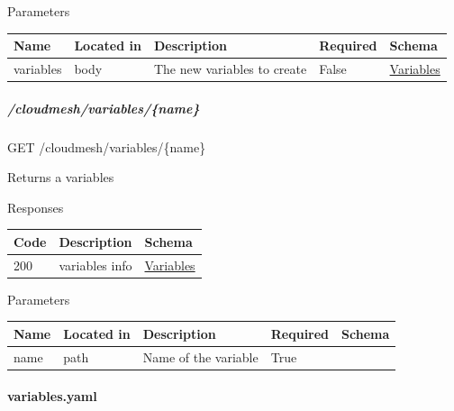 \documentclass[9pt,]{article}
\let\oldparagraph\paragraph
\renewcommand{\paragraph}[1]{\oldparagraph{#1}\mbox{}}
\let\oldsubparagraph\subparagraph
\renewcommand{\subparagraph}[1]{\oldsubparagraph{#1}\mbox{}}
\begin{document}
Parameters

\begin{longtable}[]{@{}lllll@{}}
\toprule
Name & Located in & Description & Required & Schema\tabularnewline
\midrule
\endhead
variables & body & The new variables to create & False &
\protect\hyperlink{variables}{Variables}\tabularnewline
\bottomrule
\end{longtable}

\hypertarget{cloudmeshvariablesname}{%
\subparagraph{/cloudmesh/variables/\{name\}}\label{cloudmeshvariablesname}}

GET /cloudmesh/variables/\{name\}

Returns a variables

Responses

\begin{longtable}[]{@{}lll@{}}
\toprule
Code & Description & Schema\tabularnewline
\midrule
\endhead
200 & variables info &
\protect\hyperlink{variables}{Variables}\tabularnewline
\bottomrule
\end{longtable}

Parameters

\begin{longtable}[]{@{}lllll@{}}
\toprule
Name & Located in & Description & Required & Schema\tabularnewline
\midrule
\endhead
name & path & Name of the variable & True &\tabularnewline
\bottomrule
\end{longtable}

\hypertarget{variables.yaml}{%
\paragraph{variables.yaml}\label{variables.yaml}}
\end{document}
